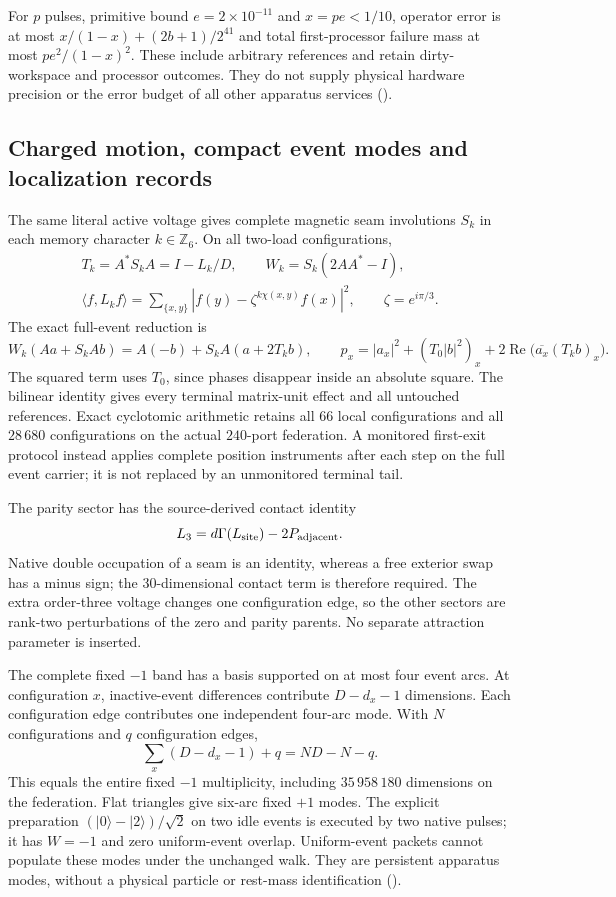 For $p$ pulses, primitive bound $e=2\times10^{-11}$ and $x=pe<1/10$,
operator error is at most $x/(1-x)+(2b+1)/2^{41}$ and total first-processor
failure mass at most $pe^2/(1-x)^2$. These include arbitrary references and
retain dirty-workspace and processor outcomes. They do not supply physical
hardware precision or the error budget of all other apparatus services
().

\subsection{Charged motion, compact event modes and localization records}

The same literal active voltage gives complete magnetic seam involutions
$S_k$ in each memory character $k\in\mathbb Z_6$. On all two-load
configurations,
\[
 \begin{gathered}
 T_k=A^*S_kA=I-L_k/D,\qquad W_k=S_k(2AA^*-I),\\
 \langle f,L_kf\rangle=\sum_{\{x,y\}}
 |f(y)-\zeta^{k\chi(x,y)}f(x)|^2,\qquad \zeta=e^{i\pi/3}.
 \end{gathered}
\]
The exact full-event reduction is
\[
 W_k(Aa+S_kAb)=A(-b)+S_kA(a+2T_kb),\qquad
 p_x=|a_x|^2+(T_0|b|^2)_x+
 2\operatorname{Re}\bigl(\overline{a_x}(T_kb)_x\bigr).
\]
The squared term uses $T_0$, since phases disappear inside an absolute
square. The bilinear identity gives every terminal matrix-unit effect and
all untouched references. Exact cyclotomic arithmetic retains all $66$
local configurations and all $28\,680$ configurations on the actual
$240$-port federation. A monitored first-exit protocol instead applies
complete position instruments after each step on the full event carrier;
it is not replaced by an unmonitored terminal tail.

The parity sector has the source-derived contact identity
\[
 L_3=d\Gamma(L_{\rm site})-2P_{\rm adjacent}.
\]
Native double occupation of a seam is an identity, whereas a free exterior
swap has a minus sign; the $30$-dimensional contact term is therefore
required. The extra order-three voltage changes one configuration edge,
so the other sectors are rank-two perturbations of the zero and parity
parents. No separate attraction parameter is inserted.

The complete fixed $-1$ band has a basis supported on at most four event
arcs. At configuration $x$, inactive-event differences contribute
$D-d_x-1$ dimensions. Each configuration edge contributes one independent
four-arc mode. With $N$ configurations and $q$ configuration edges,
\[
 \sum_x(D-d_x-1)+q=ND-N-q.
\]
This equals the entire fixed $-1$ multiplicity, including $35\,958\,180$
dimensions on the federation. Flat triangles give six-arc fixed $+1$
modes. The explicit preparation $(|0\rangle-|2\rangle)/\sqrt2$ on two idle
events is executed by two native pulses; it has $W=-1$ and zero uniform-event
overlap. Uniform-event packets cannot populate these modes under the
unchanged walk. They are persistent apparatus modes, without a physical
particle or rest-mass identification
().

